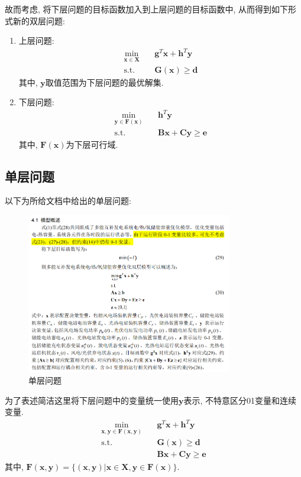 \documentclass{article}
\begin{document}
故而考虑, 将下层问题的目标函数加入到上层问题的目标函数中, 从而得到如下形式新的双层问题:
\begin{enumerate}
    \item {上层问题:
        \begin{align}
            \min\limits_{\boldsymbol{x}\in\boldsymbol{X}}\quad & \boldsymbol{g}^T\boldsymbol{x}+\boldsymbol{h}^T\boldsymbol{y}  \label{UL_obj2} \\
            \mathrm{s.t.}\quad &\boldsymbol{G(x)}\geq \boldsymbol{d}  \label{UL_con12}
        \end{align}
        其中, $\boldsymbol{y}$取值范围为下层问题的最优解集.
    }
    \item {下层问题:
        \begin{align}
            \min\limits_{\boldsymbol{y}\in\boldsymbol{F(x)}}\quad & \boldsymbol{h}^T\boldsymbol{y} \\
            \mathrm{s.t.}\quad &\boldsymbol{Bx}+\boldsymbol{Cy}\geq \boldsymbol{e}
        \end{align}
        其中, $\boldsymbol{F(x)}$为下层可行域.
    }
\end{enumerate}

\subsection{单层问题}
以下为所给文档中给出的单层问题:
\begin{figure}[H]
    \centering
    \includegraphics[width=0.8\textwidth]{./pic/单层问题.png}
    \caption{单层问题}
    \label{fig:single_level_programming}
\end{figure}
为了表述简洁这里将下层问题中的变量统一使用$\boldsymbol{y}$表示, 不特意区分01变量和连续变量.
\begin{align}
    \min\limits_{\boldsymbol{x,y}\in\boldsymbol{F(x,y)}}\quad & \boldsymbol{g}^T\boldsymbol{x}+\boldsymbol{h}^T\boldsymbol{y}\\
    \mathrm{s.t.}\quad &\boldsymbol{G(x)}\geq \boldsymbol{d} \\
    &\boldsymbol{Bx}+\boldsymbol{Cy}\geq \boldsymbol{e}
\end{align}
其中, $\boldsymbol{F(x,y)}=\{(\boldsymbol{x,y})|\boldsymbol{x}\in\boldsymbol{X},\boldsymbol{y}\in\boldsymbol{F(x)}\}$.
\end{document}
